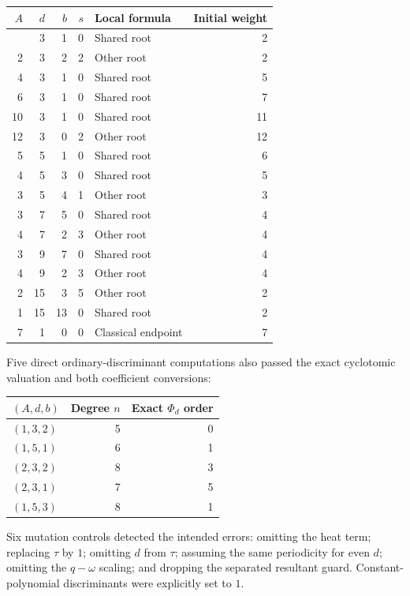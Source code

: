 \documentclass[
  11pt,
]{article}
\begin{document}
\begin{longtable}[]{@{}rrrrlr@{}}
\toprule\noalign{}
\(A\) & \(d\) & \(b\) & \(s\) & Local formula & Initial weight \\
\midrule\noalign{}
\endhead
\bottomrule\noalign{}
\endlastfoot
1 & 3 & 1 & 0 & Shared root & 2 \\
2 & 3 & 2 & 2 & Other root & 2 \\
4 & 3 & 1 & 0 & Shared root & 5 \\
6 & 3 & 1 & 0 & Shared root & 7 \\
10 & 3 & 1 & 0 & Shared root & 11 \\
12 & 3 & 0 & 2 & Other root & 12 \\
5 & 5 & 1 & 0 & Shared root & 6 \\
4 & 5 & 3 & 0 & Shared root & 5 \\
3 & 5 & 4 & 1 & Other root & 3 \\
3 & 7 & 5 & 0 & Shared root & 4 \\
4 & 7 & 2 & 3 & Other root & 4 \\
3 & 9 & 7 & 0 & Shared root & 4 \\
4 & 9 & 2 & 3 & Other root & 4 \\
2 & 15 & 3 & 5 & Other root & 2 \\
1 & 15 & 13 & 0 & Shared root & 2 \\
7 & 1 & 0 & 0 & Classical endpoint & 7 \\
\end{longtable}

Five direct ordinary-discriminant computations also passed the exact
cyclotomic valuation and both coefficient conversions:

\begin{longtable}[]{@{}lrr@{}}
\toprule\noalign{}
\((A,d,b)\) & Degree \(n\) & Exact \(\Phi_d\) order \\
\midrule\noalign{}
\endhead
\bottomrule\noalign{}
\endlastfoot
\((1,3,2)\) & 5 & 0 \\
\((1,5,1)\) & 6 & 1 \\
\((2,3,2)\) & 8 & 3 \\
\((2,3,1)\) & 7 & 5 \\
\((1,5,3)\) & 8 & 1 \\
\end{longtable}

Six mutation controls detected the intended errors: omitting the heat
term; replacing \(\tau\) by \(1\); omitting \(d\) from \(\tau\);
assuming the same periodicity for even \(d\); omitting the \(q-\omega\)
scaling; and dropping the separated resultant guard. Constant-polynomial
discriminants were explicitly set to \(1\).
\end{document}
